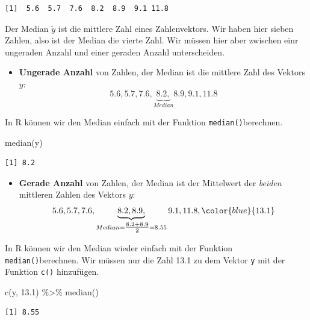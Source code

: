 \documentclass[
  letterpaper,
]{scrbook}
\newenvironment{Shaded}{\begin{snugshade}}{\end{snugshade}}
\newcommand{\FloatTok}[1]{\textcolor[rgb]{0.68,0.00,0.00}{#1}}
\newcommand{\FunctionTok}[1]{\textcolor[rgb]{0.28,0.35,0.67}{#1}}
\newcommand{\NormalTok}[1]{\textcolor[rgb]{0.00,0.23,0.31}{#1}}
\newcommand{\SpecialCharTok}[1]{\textcolor[rgb]{0.37,0.37,0.37}{#1}}
\providecommand{\tightlist}{%
  \setlength{\itemsep}{0pt}\setlength{\parskip}{0pt}}\usepackage{longtable,booktabs,array}
\begin{document}
\begin{verbatim}
[1]  5.6  5.7  7.6  8.2  8.9  9.1 11.8
\end{verbatim}

Der Median \(\tilde{y}\) ist die mittlere Zahl eines Zahlenvektors. Wir
haben hier sieben Zahlen, also ist der Median die vierte Zahl. Wir
müssen hier aber zwischen einr ungeraden Anzahl und einer geraden Anzahl
unterscheiden.

\begin{itemize}
\tightlist
\item
  \textbf{Ungerade Anzahl} von Zahlen, der Median ist die mittlere Zahl
  des Vektors \(y\): \[
  5.6,  5.7,  7.6,  \underbrace{8.2,}_{Median}  8.9,  9.1, 11.8
  \]
\end{itemize}

In R können wir den Median einfach mit der Funktion
\texttt{median()}berechnen.

\begin{Shaded}
\begin{Highlighting}[]
\FunctionTok{median}\NormalTok{(y) }
\end{Highlighting}
\end{Shaded}

\begin{verbatim}
[1] 8.2
\end{verbatim}

\begin{itemize}
\tightlist
\item
  \textbf{Gerade Anzahl} von Zahlen, der Median ist der Mittelwert der
  \emph{beiden} mittleren Zahlen des Vektors \(y\): \[
  5.6,  5.7,  7.6,  \underbrace{8.2, 8.9,}_{Median = \tfrac{8.2+8.9}{2}=8.55} 9.1, 11.8, \color{blue}{13.1}
  \]
\end{itemize}

In R können wir den Median wieder einfach mit der Funktion
\texttt{median()}berechnen. Wir müssen nur die Zahl 13.1 zu dem Vektor
\texttt{y} mit der Funktion \texttt{c()} hinzufügen.

\begin{Shaded}
\begin{Highlighting}[]
\FunctionTok{c}\NormalTok{(y, }\FloatTok{13.1}\NormalTok{) }\SpecialCharTok{\%\textgreater{}\%} \FunctionTok{median}\NormalTok{() }
\end{Highlighting}
\end{Shaded}

\begin{verbatim}
[1] 8.55
\end{verbatim}
\end{document}
